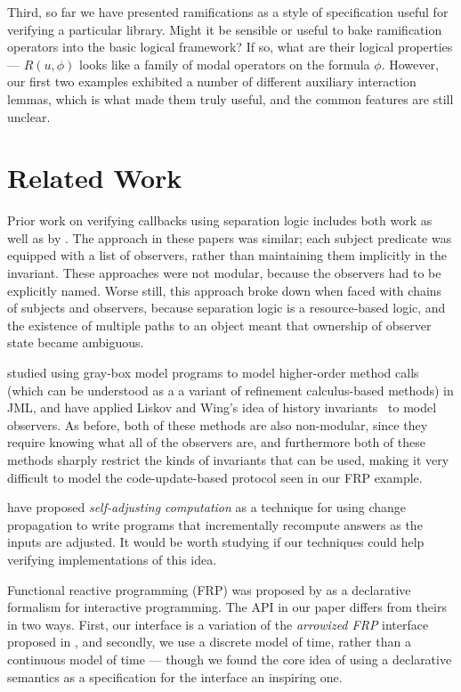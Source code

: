 Third, so far we have presented ramifications as a style of
specification useful for verifying a particular library.  Might it be
sensible or useful to bake ramification operators into the basic
logical framework?  If so, what are their logical properties --- $R(u,
\phi)$ looks like a family of modal operators on the formula $\phi$.
However, our first two examples exhibited a number of different
auxiliary interaction lemmas, which is what made them truly useful, 
and the common features are still unclear. 

\section{Related Work}

Prior work on verifying callbacks using separation logic includes both
\citet{tldi09,ftfjp07} work as well as by
\citet{parkinson-iwaco-07}. The approach in these papers was similar;
each subject predicate was equipped with a list of observers, rather
than maintaining them implicitly in the invariant. These approaches
were not modular, because the observers had to be explicitly
named. Worse still, this approach broke down when faced with chains of
subjects and observers, because separation logic is a resource-based
logic, and the existence of multiple paths to an object meant that
ownership of observer state became ambiguous.

\citet{shaner-leavens-naumann} studied using gray-box model programs
to model higher-order method calls (which can be understood as a a
variant of refinement calculus-based methods) in JML, and
\citet{history-invariants} have applied Liskov and Wing's idea of
history invariants~\cite{liskov-wing} to model observers. As before,
both of these methods are also non-modular, since they require knowing
what all of the observers are, and furthermore both of these methods
sharply restrict the kinds of invariants that can be used, making it
very difficult to model the code-update-based protocol seen in our FRP
example.

\citet{self-adjusting} have proposed
\emph{self-adjusting computation} as a technique for using change
propagation to write programs that incrementally
recompute answers as the inputs are adjusted. It would be worth 
studying if our techniques could help verifying implementations of this
idea.

Functional reactive programming (FRP) was proposed by \citet{frp} as a
declarative formalism for interactive programming. The API in our
paper differs from theirs in two ways. First, our interface is a
variation of the \emph{arrowized FRP} interface proposed in
\cite{afrp}, and secondly, we use a discrete model of time, rather
than a continuous model of time --- though we found the core idea of
using a declarative semantics as a specification for the interface an
inspiring one.

